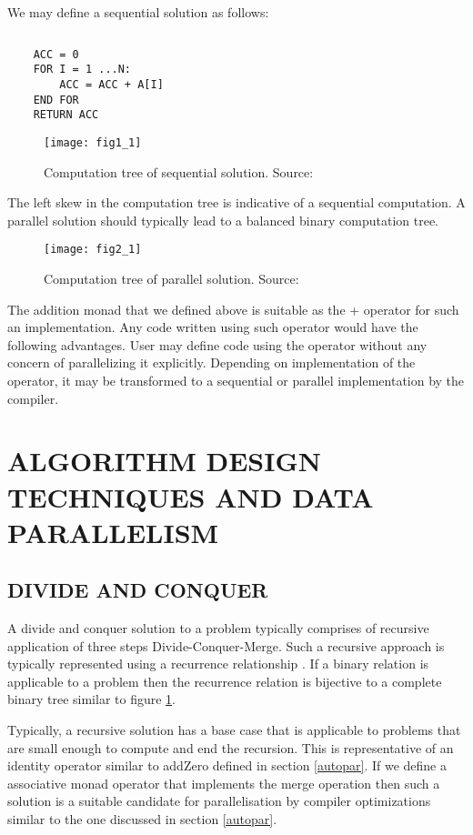 \documentclass[12pt,a4paper]{article}
\begin{document}
We may define a sequential solution as follows:
    	\lstset{}
	\begin{lstlisting}
	\end{lstlisting}
    	\lstset{}
	\begin{lstlisting}
	ACC = 0
	FOR I = 1 ...N:
		ACC = ACC + A[I]
	END FOR
	RETURN ACC
	\end{lstlisting}
	
	\begin{figure}[h]
	\texttt{[image: fig1\_1]}
	\caption{Computation tree of sequential solution. Source: \cite{steele}}
		\centering
	\end{figure}
	
	The left skew in the computation tree is indicative of a sequential computation.
A parallel solution should typically lead to a balanced binary computation tree.

	\begin{figure}[h]
	\texttt{[image: fig2\_1]}
	\caption{Computation tree of parallel solution. Source: \cite{steele}}
	\centering
	\label{fig:par}
	\end{figure}

\par The addition monad that we defined above is suitable as the + operator for such an implementation. Any code written using such operator would have the following advantages. User may define code using the operator without any concern of parallelizing it explicitly. Depending on implementation of the operator, it may be transformed to a sequential or parallel implementation by the compiler.

	\section{\large ALGORITHM DESIGN TECHNIQUES AND DATA PARALLELISM}
	\subsection{DIVIDE AND CONQUER}
	\indent \par A divide and conquer solution to a problem typically comprises of recursive application of three steps Divide-Conquer-Merge. Such a recursive approach is typically represented using a recurrence relationship \cite{cormen}. If a binary relation is applicable to a problem then the recurrence relation is bijective to a complete binary tree similar to figure \ref{fig:par}.
	\par Typically, a recursive solution has a base case that is applicable to problems that are small enough to compute and end the recursion. This is representative of an identity operator similar to addZero defined in section \ref{autopar}. If we define a associative monad operator that implements the merge operation then such a solution is a suitable candidate for parallelisation by compiler optimizations similar to the one discussed in section \ref{autopar}.
\end{document}
